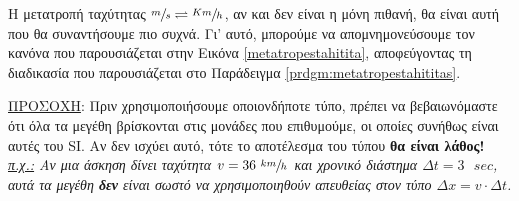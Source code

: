 \noindent \begin{minipage}{0.45\textwidth}
\vspace{1cm}
%
\label{metatropestahitita}
\end{minipage}
\hspace{0.05\textwidth}
\begin{minipage}{0.45\textwidth}
Η μετατροπή ταχύτητας $\sfrac{\large{m}}{\large{s}}\rightleftharpoons \sfrac{\large{Km}}{\large{h}}$, αν και δεν είναι η μόνη πιθανή, θα είναι αυτή που θα συναντήσουμε πιο συχνά. Γι' αυτό, μπορούμε να απομνημονεύσουμε τον κανόνα που παρουσιάζεται στην Εικόνα \ref{metatropestahitita}, αποφεύγοντας τη διαδικασία που παρουσιάζεται στο Παράδειγμα \ref{prdgm:metatropestahititas}.
\end{minipage}

\begin{shaded*}
\underline{ΠΡΟΣΟΧΗ}: Πριν χρησιμοποιήσουμε οποιονδήποτε τύπο, πρέπει να βεβαιωνόμαστε ότι όλα τα μεγέθη βρίσκονται στις μονάδες που επιθυμούμε, οι οποίες συνήθως είναι αυτές του SI. Αν δεν ισχύει αυτό, τότε το αποτέλεσμα του τύπου \textbf{θα είναι λάθος!}\\
\textit{\underline{π.χ.:} Aν μια άσκηση δίνει ταχύτητα $v=36 \text{ }\sfrac{km}{h}$ και χρονικό διάστημα $\Delta t=3 \text{ }sec$, αυτά τα μεγέθη \textbf{δεν} είναι σωστό να χρησιμοποιηθούν απευθείας στον τύπο $\Delta x=v\cdot \Delta t$.}
\end{shaded*}


